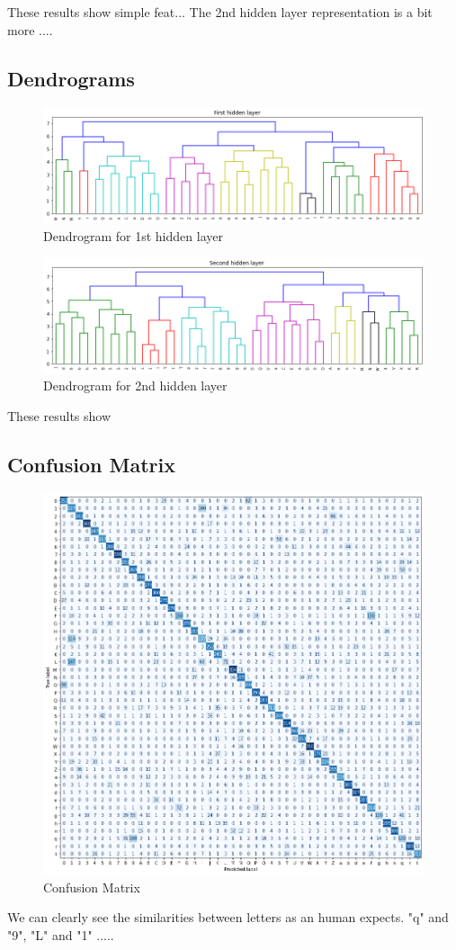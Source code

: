 \documentclass[a4paper, 11pt]{article}
\begin{document}
			These results show simple feat...
			The 2nd hidden layer representation is a bit more ....
		
		\subsection{Dendrograms}
		
			\begin{figure}[H]
				\centering
				\includegraphics[width=.8\linewidth]{dend1.png}  
				\caption{Dendrogram for 1st hidden layer}
				\label{fig:dend1}
			\end{figure}
		
			\begin{figure}[H]
				\centering
				\includegraphics[width=.8\linewidth]{dend2.png}  
				\caption{Dendrogram for 2nd hidden layer}
				\label{fig:dend2}
			\end{figure}
		
			These results show 

		
		\subsection{Confusion Matrix}	
			\begin{figure}[H]
				\centering
				\includegraphics[width=.6\linewidth]{confmatBlue2.png} %
				\caption{Confusion Matrix}
				\label{fig:confmat}
			\end{figure}
			We can clearly see the similarities between letters as an human expects.
			"q" and "9", "L" and "1" .....
			
\end{document}
